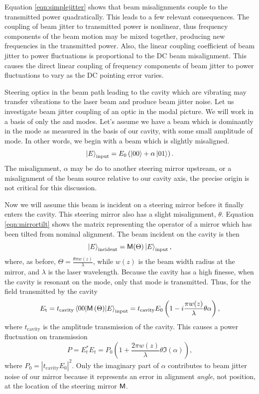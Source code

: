 Equation \ref{eqn:simplejitter} shows that beam misalignments couple to the transmitted power quadratically. %
This leads to a few relevant consequences. %
The coupling of beam jitter to transmitted power is nonlinear, thus frequency components of the beam motion may be mixed together, producing new frequencies in the transmitted power. %
Also, the linear coupling coefficient of beam jitter to power fluctuations is proportional to the DC beam misalignment. %
This causes the direct linear coupling of frequency components of beam jitter to power fluctuations to vary as the DC pointing error varies.

Steering optics in the beam path leading to the cavity which are vibrating may transfer vibrations to the laser beam and produce beam jitter noise. %
Let us investigate beam jitter coupling of an optic in the modal picture. %
 We will work in a basis of only the  and  modes. %
Let's assume we have a beam which is dominantly in the  mode as measured in the basis of our cavity, with some small amplitude of  mode. %
In other words, we begin with a beam which is slightly misaligned.
\begin{equation}
\left| E \right>_{\text{input}}=E_0\left(\left| 00 \right>+\alpha\left| 01 \right>\right).
\end{equation}
The misalignment, $\alpha$ may be do to another steering mirror upstream, or a misalignment of the beam source relative to our cavity axis, the precise origin is not critical for this discussion.

Now we will assume this beam is incident on a steering mirror before it finally enters the cavity. %
This steering mirror also has a slight misalignment, $\theta$. %
Equation \ref{eqn:mirrortilt} shows the matrix representing the operator of a mirror which has been tilted from nominal alignment. %
The beam incident on the cavity is then
\begin{equation}
\left| E \right>_{\text{incident}}=\mathsf{M}(\Theta)\left| E \right>_{\text{input}},
\end{equation}
where, as before, $\Theta=\frac{\theta \pi w(z)}{\lambda}$, while $w(z)$ is the beam width radius at the mirror, and $\lambda$ is the laser wavelength. %
Because the cavity has a high finesse, when the cavity is resonant on the  mode, only that mode is transmitted. %
Thus, for the field transmitted by the cavity
\begin{equation}
E_{\text{t}}=t_{\text{cavity}}\matrixel{00}{\oper{M}\left(\Theta\right)}{E}_{\text{input}}=t_{\text{cavity}}E_0\left(1-i\frac{ \pi w(z)}{\lambda}\theta\alpha\right),
\end{equation}
where $t_{\text{cavity}}$ is the amplitude transmission of the cavity. %
This causes a power fluctuation on transmission
\begin{equation}
\label{eqn:mirrorjitter}
P=E_t^*E_t=P_0\left(1+\frac{2\pi w(z)}{\lambda}\theta\Im(\alpha)\right),
\end{equation}
where $P_0=|t_{\text{cavity}}E_0|^2$. %
Only the imaginary part of $\alpha$ contributes to beam jitter noise of our mirror because it represents an error in alignment \emph{angle}, not position, at the location of the steering mirror $\mathsf{M}$. %


